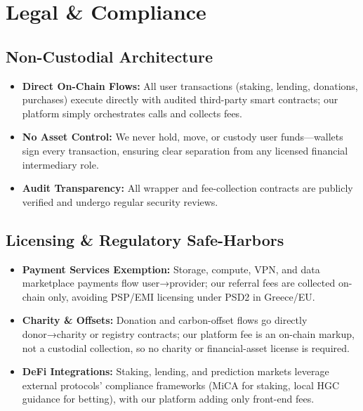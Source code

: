\documentclass[13pt]{extarticle}
\begin{document}
\newpage
\section{Legal \& Compliance}

\subsection{Non-Custodial Architecture}
\begin{itemize}[left=1em]
  \item \textbf{Direct On-Chain Flows:} All user transactions (staking, lending, donations, purchases) execute directly with audited third-party smart contracts; our platform simply orchestrates calls and collects fees.
  \item \textbf{No Asset Control:} We never hold, move, or custody user funds—wallets sign every transaction, ensuring clear separation from any licensed financial intermediary role.
  \item \textbf{Audit Transparency:} All wrapper and fee-collection contracts are publicly verified and undergo regular security reviews.
\end{itemize}

\subsection{Licensing \& Regulatory Safe-Harbors}
\begin{itemize}[left=1em]
  \item \textbf{Payment Services Exemption:} Storage, compute, VPN, and data marketplace payments flow user→provider; our referral fees are collected on-chain only, avoiding PSP/EMI licensing under PSD2 in Greece/EU.
  \item \textbf{Charity \& Offsets:} Donation and carbon-offset flows go directly donor→charity or registry contracts; our platform fee is an on-chain markup, not a custodial collection, so no charity or financial-asset license is required.
  \item \textbf{DeFi Integrations:} Staking, lending, and prediction markets leverage external protocols’ compliance frameworks (MiCA for staking, local HGC guidance for betting), with our platform adding only front-end fees.
\end{itemize}
\end{document}

